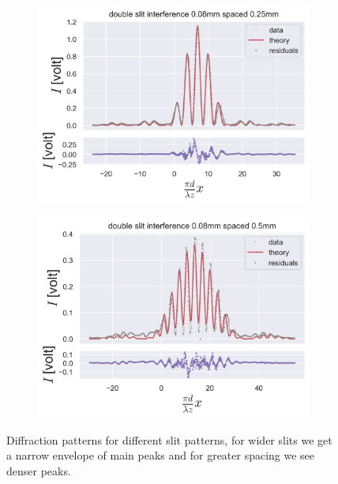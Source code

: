 \begin{figure}[H]
    \centering
    \begin{subfigure}{0.5\columnwidth}
        \centering
        \includegraphics[width=\columnwidth]{figures/0.08w0.25s.png} %
        \caption{}
        \label{fig:double slit interference 0.08w0.25s}
    \end{subfigure}\hfill
    \begin{subfigure}{0.5\columnwidth}
        \centering
        \includegraphics[width=\columnwidth]{figures/0.08w0.5s.png} %
        \caption{}
        \label{fig:single slit interference 0.16mm}
    \end{subfigure}
    \caption{Diffraction patterns for different slit patterns, for wider slits we get a narrow envelope of main peaks and for greater spacing we see denser peaks.}
\end{figure}